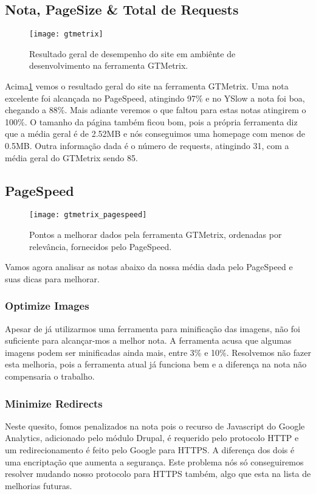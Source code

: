 \subsection{Nota, PageSize & Total de Requests}

\begin{figure}[ht]
  \centering
  \texttt{[image: gtmetrix]}
  \caption{Resultado geral de desempenho do site em ambiênte de desenvolvimento na ferramenta GTMetrix.}
  \label{gtmetrix}
\end{figure}

Acima\ref{gtmetrix} vemos o resultado geral do site na ferramenta GTMetrix. Uma nota excelente foi alcançada no PageSpeed, atingindo 97\% e no YSlow a nota foi boa, chegando a 88\%. Mais adiante veremos o que faltou para estas notas atingirem o 100\%. O tamanho da página também ficou bom, pois a própria ferramenta diz que a média geral é de 2.52MB e nós conseguimos uma homepage com menos de 0.5MB. Outra informação dada é o número de requests, atingindo 31, com a média geral do GTMetrix sendo 85.

\subsection{PageSpeed}

\begin{figure}[ht]
  \centering
  \texttt{[image: gtmetrix\_pagespeed]}
  \caption{Pontos a melhorar dados pela ferramenta GTMetrix, ordenadas por relevância, fornecidos pelo PageSpeed.}
  \label{gtmetrix_pagespeed}
\end{figure}

Vamos agora analisar as notas abaixo da nossa média dada pelo PageSpeed e suas dicas para melhorar.

\subsubsection{Optimize Images}
Apesar de já utilizarmos uma ferramenta para minificação das imagens, não foi suficiente para alcançar-mos a melhor nota. A ferramenta acusa que algumas imagens podem ser minificadas ainda mais, entre 3\% e 10\%. Resolvemos não fazer esta melhoria, pois a ferramenta atual já funciona bem e a diferença na nota não compensaria o trabalho.

\subsubsection{Minimize Redirects}
Neste quesito, fomos penalizados na nota pois o recurso de Javascript do Google Analytics, adicionado pelo módulo Drupal, é requerido pelo protocolo HTTP e um redirecionamento é feito pelo Google para HTTPS. A diferença dos dois é uma encriptação que aumenta a segurança. Este problema nós só conseguiremos resolver mudando nosso protocolo para HTTPS também, algo que esta na lista de melhorias futuras.

